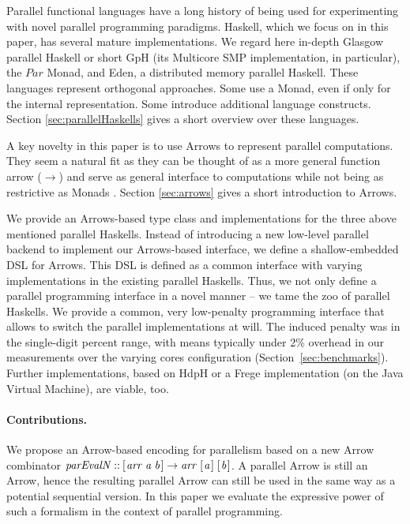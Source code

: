 \documentclass{jfp1}
\newcommand{\Conid}[1]{\mathit{#1}}
\newcommand{\Varid}[1]{\mathit{#1}}
\newcommand{\comm}[2]{}
\newcommand{\olcomment}[1]{\comm{OL}{#1}}
\begin{document}
Parallel functional languages have a long history of being used for experimenting with novel parallel programming paradigms. Haskell, which we focus on in this paper, has  several mature implementations. We regard here in-depth
Glasgow parallel Haskell or short GpH (its Multicore SMP implementation, in particular), the
\ensuremath{\Conid{Par}} Monad, and Eden, a distributed memory parallel Haskell. These
languages represent orthogonal approaches. Some use a Monad, even if
only for the internal representation. Some introduce additional
language constructs. Section \ref{sec:parallelHaskells} gives a short overview over these languages.

A key novelty in this paper is to use Arrows to represent parallel computations. They seem a natural fit as they can be thought of as a more general function arrow (\ensuremath{\to }) and serve as general interface to computations while not being as restrictive as Monads \citep{HughesArrows}. Section \ref{sec:arrows} gives a short introduction to Arrows.

We provide an Arrows-based type class and implementations for the three above mentioned parallel Haskells.
Instead of 
introducing a new low-level parallel backend to implement our
Arrows-based interface, we define a shallow-embedded DSL for Arrows. This DSL
is defined as a common interface with varying implementations in
the existing parallel Haskells. Thus, we not only define a parallel programming interface in a
novel manner -- we tame the zoo of parallel Haskells. We provide a
common, very low-penalty programming interface that allows to switch
the parallel implementations at will. The induced penalty was in the single-digit percent range, with means typically under 2\% overhead in our measurements over the varying cores configuration (Section~\ref{sec:benchmarks}). Further implementations, based on HdpH or a Frege implementation (on the Java Virtual Machine), are viable, too.

\paragraph{Contributions.}
%
%
We propose an Arrow-based encoding for parallelism based on a new Arrow combinator \ensuremath{\Varid{parEvalN}\mathbin{::}[\mskip1.5mu \Varid{arr}\;\Varid{a}\;\Varid{b}\mskip1.5mu]\to \Varid{arr}\;[\mskip1.5mu \Varid{a}\mskip1.5mu]\;[\mskip1.5mu \Varid{b}\mskip1.5mu]}. A parallel Arrow is still an Arrow, hence the resulting parallel Arrow can still be used in the same way as a potential sequential version. In this paper we evaluate the expressive power of such a formalism in the context of parallel programming.
\end{document}
